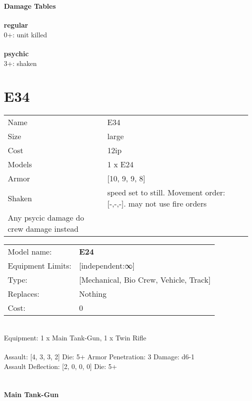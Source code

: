 {\bf Damage Tables} \\
\ \\ {\bf regular } \\
0+: unit killed \\
\ \\ {\bf psychic } \\
3+: shaken \\










\pagebreak\pagebreak

\section{ E34 }

\begin{tabular}{ll}
  Name & E34 \\
  Size & large\\
  Cost & 12ip\\
  Models & 1 x E24\\
  Armor & [10, 9, 9, 8]\\
  Shaken & speed set to still. Movement order: [-,-,-]. may not use fire orders \ \\ Any psycic damage do crew damage instead\\
\end{tabular}

\noindent 

\noindent
\begin{tabular}{ll}
Model name: &{\bf E24 } \\
Equipment Limits: &[independent:∞] \\
Type: &[Mechanical, Bio Crew, Vehicle, Track] \\
Replaces: &Nothing \\
Cost: & 0\\
\end{tabular}
\ \\
Equipment: 1 x Main Tank-Gun, 1 x Twin Rifle \\
\ \\
Assault: [4, 3, 3, 2] Die: 5+ Armor Penetration: 3 Damage: d6-1 \\
Assault Deflection: [2, 0, 0, 0] Die: 5+\\
\indent  
\ \\

\ \\
{\bf Main Tank-Gun } \\



